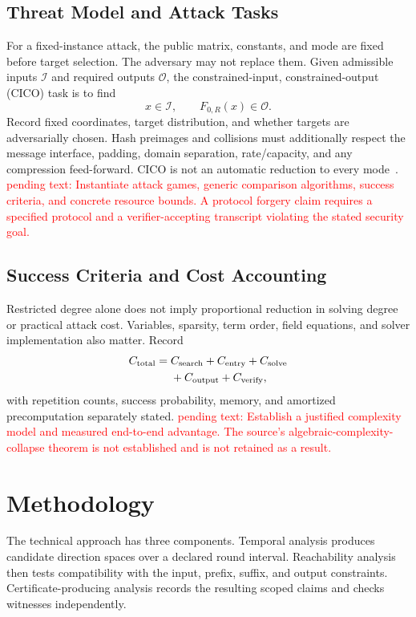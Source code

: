\documentclass[conference]{IEEEtran}
\theoremstyle{definition}
\theoremstyle{plain}
\begin{document}
\subsection{Threat Model and Attack Tasks}
For a fixed-instance attack, the public matrix, constants, and mode
are fixed before target selection. The adversary may not replace them.
Given admissible inputs $\mathcal I$ and required outputs $\mathcal O$,
the constrained-input, constrained-output (CICO) task is to find
\begin{equation}
x\in\mathcal I,\qquad F_{0,R}(x)\in\mathcal O.
\label{eq:cico}
\end{equation}
Record fixed coordinates, target distribution, and whether targets are
adversarially chosen. Hash preimages and collisions must additionally
respect the message interface, padding, domain separation, rate/capacity,
and any compression feed-forward. CICO is not an automatic reduction
to every mode~\cite{poseidonneptune2025,cryptoeprint:2026/306}.
\textcolor{red}{pending text: Instantiate attack games, generic comparison
algorithms, success criteria, and concrete resource bounds. A protocol
forgery claim requires a specified protocol and a verifier-accepting
transcript violating the stated security goal.}
\subsection{Success Criteria and Cost Accounting}
Restricted degree alone does not imply proportional reduction in solving
degree or practical attack cost. Variables, sparsity, term order, field
equations, and solver implementation also matter. Record
\begin{equation}
\begin{split}
C_{\rm total}={}&C_{\rm search}+C_{\rm entry}+C_{\rm solve}\\
&+C_{\rm output}+C_{\rm verify},
\end{split}
\label{eq:cost}
\end{equation}
with repetition counts, success probability, memory, and amortized
precomputation separately stated.
\textcolor{red}{pending text: Establish a justified complexity model and
measured end-to-end advantage. The source's algebraic-complexity-collapse
theorem is not established and is not retained as a result.}


\section{Methodology}
\label{sec:methodology}
\label{sec:theory}
The technical approach has three components. Temporal analysis produces
candidate direction spaces over a declared round interval. Reachability
analysis then tests compatibility with the input, prefix, suffix, and
output constraints. Certificate-producing analysis records the resulting
scoped claims and checks witnesses independently.
\end{document}
